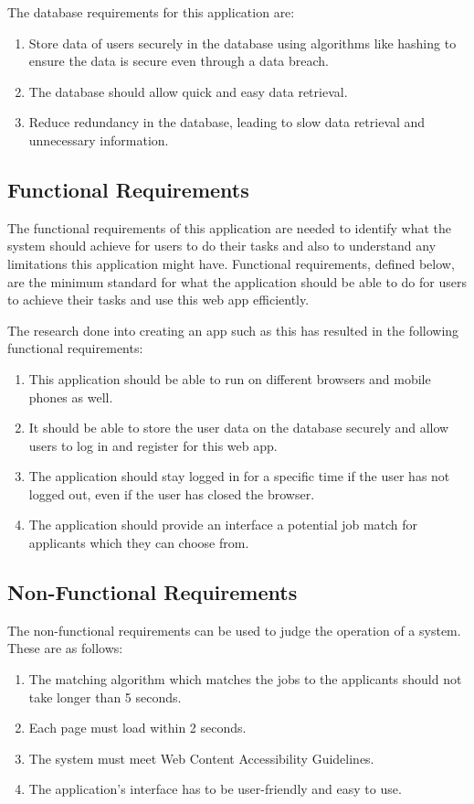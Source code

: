 The database requirements for this application are:
\begin{enumerate}
    \item Store data of users securely in the database using algorithms like hashing to ensure the data is secure even through a data breach. \parencite{Reference29}
    \item The database should allow quick and easy data retrieval.
    \item Reduce redundancy in the database, leading to slow data retrieval and unnecessary information.
\end{enumerate}

\subsection{Functional Requirements}
The functional requirements of this application are needed to identify what the system should achieve for users to do their tasks and also to understand any limitations this application might have. Functional requirements, defined below, are the minimum standard for what the application should be able to do for users to achieve their tasks and use this web app efficiently.

The research done into creating an app such as this has resulted in the following functional requirements:
\begin{enumerate}
    \item This application should be able to run on different browsers and mobile phones as well.
    \item It should be able to store the user data on the database securely and allow users to log in and register for this web app.
    \item The application should stay logged in for a specific time if the user has not logged out, even if the user has closed the browser.
    \item The application should provide an interface a potential job match for applicants which they can choose from.
\end{enumerate}

\subsection{Non-Functional Requirements}
The non-functional requirements can be used to judge the operation of a system. These are as follows:
\begin{enumerate}
    \item The matching algorithm which matches the jobs to the applicants should not take longer than 5 seconds.
    \item Each page must load within 2 seconds.
    \item The system must meet Web Content Accessibility Guidelines. \parencite{Reference30}
    \item The application's interface has to be user-friendly and easy to use.
\end{enumerate}


